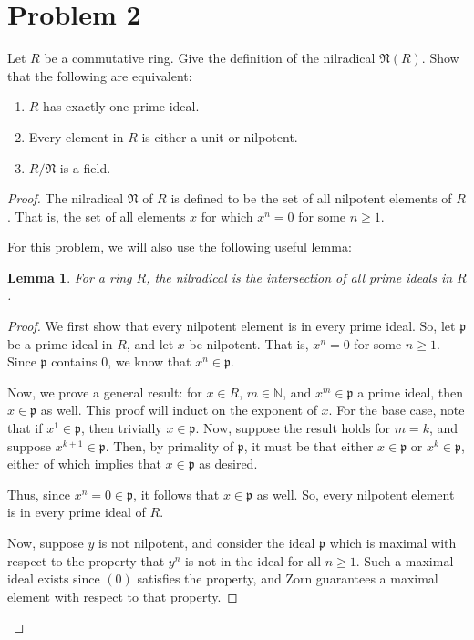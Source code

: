 \documentclass[12pt,reqno]{amsart}
\newcommand{\N}{\mathbb{N}}
\newtheorem*{lemma}{Lemma}
\begin{document}
\section*{Problem 2}
Let $R$ be a commutative ring. Give the definition of the nilradical
$\mathfrak{N}(R)$. Show that the following are equivalent:
\begin{enumerate}[i]
    \item $R$ has exactly one prime ideal.
    \item Every element in $R$ is either a unit or nilpotent.
    \item $R/{\mathfrak{N}}$ is a field.
\end{enumerate}
\begin{proof}
    The nilradical $\mathfrak{N}$ of $R$ is defined to be the set of all
    nilpotent elements of $R$. That is, the set of all elements $x$ for which
    $x^n = 0$ for some $n\geq 1$.

    For this problem, we will also use the following useful lemma:
    \begin{lemma}
        For a ring $R$, the nilradical is the intersection of all prime ideals
        in $R$.
    \end{lemma}
    \begin{proof}
        We first show that every nilpotent element is in every prime ideal.
        So, let $\mathfrak{p}$ be a prime ideal in $R$, and let $x$ be
        nilpotent. That is, $x^n = 0$ for some $n\geq 1$. Since $\mathfrak{p}$
        contains $0$, we know that $x^n\in\mathfrak{p}$.

        Now, we prove a general result: for $x\in R$, $m\in\N$, and $x^m\in\mathfrak{p}$ a
        prime ideal, then $x\in\mathfrak{p}$ as well. This proof will induct on
        the exponent of $x$. For the base case, note that if
        $x^1\in\mathfrak{p}$, then trivially $x\in\mathfrak{p}$. Now, suppose
        the result holds for $m=k$, and suppose $x^{k+1}\in\mathfrak{p}$. Then,
        by primality of $\mathfrak{p}$, it must be that either
        $x\in\mathfrak{p}$ or $x^k\in\mathfrak{p}$, either of which implies that
        $x\in\mathfrak{p}$ as desired.

        Thus, since $x^n=0\in\mathfrak{p}$, it follows that $x\in\mathfrak{p}$
        as well. So, every nilpotent element is in every prime ideal of $R$.

        Now, suppose $y$ is not nilpotent, and consider the ideal $\mathfrak{p}$
        which is maximal with respect to the property that $y^n$ is not in the
        ideal for all $n\geq 1$. Such a maximal ideal exists since $(0)$
        satisfies the property, and Zorn guarantees a maximal element with
        respect to that property.


\end{proof}
\end{proof}
\end{document}

